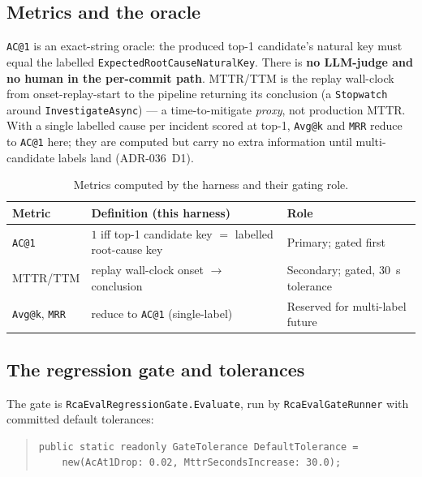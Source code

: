 \documentclass[11pt]{article}
\makeatletter
\newcommand{\acone}{\texttt{AC@1}}
\newcommand{\code}[1]{\texttt{#1}}
\makeatother
\begin{document}
\subsection{Metrics and the oracle}
\label{sec:metrics}

\acone{} is an exact-string oracle: the produced top-1 candidate's natural key must equal
the labelled \code{ExpectedRootCauseNaturalKey}. There is \textbf{no LLM-judge and no human
in the per-commit path}. MTTR/TTM is the replay wall-clock from onset-replay-start to the
pipeline returning its conclusion (a \code{Stopwatch} around \code{InvestigateAsync}) --- a
time-to-mitigate \emph{proxy}, not production MTTR. With a single labelled cause per incident
scored at top-1, \code{Avg@k} and \code{MRR} reduce to \acone{} here; they are computed but
carry no extra information until multi-candidate labels land (ADR-036~D1).

\begin{table}[h]
\centering
\caption{Metrics computed by the harness and their gating role.}
\label{tab:metrics}
\begin{tabular}{lll}
\toprule
Metric & Definition (this harness) & Role \\
\midrule
\acone{}        & $1$ iff top-1 candidate key $=$ labelled root-cause key & Primary; gated first \\
MTTR/TTM        & replay wall-clock onset $\rightarrow$ conclusion        & Secondary; gated, 30~s tolerance \\
\code{Avg@k}, \code{MRR} & reduce to \acone{} (single-label)              & Reserved for multi-label future \\
\bottomrule
\end{tabular}
\end{table}

\subsection{The regression gate and tolerances}
\label{sec:gate}

The gate is \code{RcaEvalRegressionGate.Evaluate}, run by \code{RcaEvalGateRunner} with
committed default tolerances:

\begin{quote}
\begin{verbatim}
public static readonly GateTolerance DefaultTolerance =
    new(AcAt1Drop: 0.02, MttrSecondsIncrease: 30.0);
\end{verbatim}
\end{quote}
\end{document}

